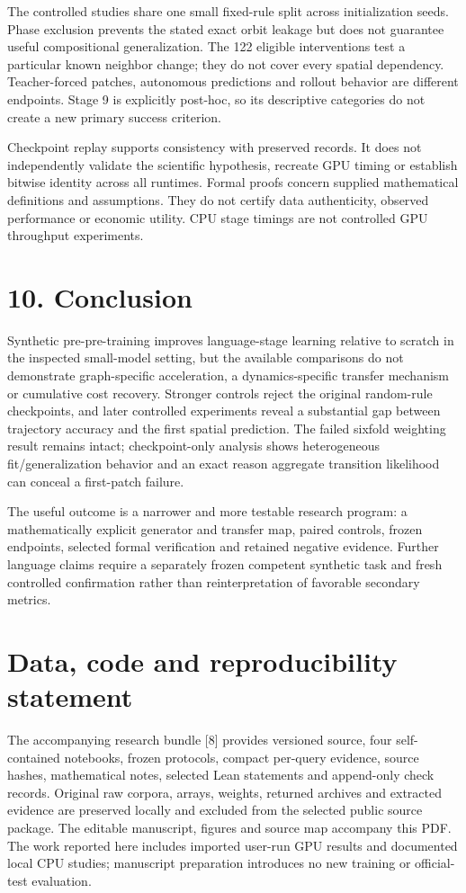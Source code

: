 \documentclass[11pt,a4paper]{article}
\begin{document}
The controlled studies share one small fixed-rule split across initialization seeds. Phase exclusion prevents the stated exact orbit leakage but does not guarantee useful compositional generalization. The 122 eligible interventions test a particular known neighbor change; they do not cover every spatial dependency. Teacher-forced patches, autonomous predictions and rollout behavior are different endpoints. Stage 9 is explicitly post-hoc, so its descriptive categories do not create a new primary success criterion.

Checkpoint replay supports consistency with preserved records. It does not independently validate the scientific hypothesis, recreate GPU timing or establish bitwise identity across all runtimes. Formal proofs concern supplied mathematical definitions and assumptions. They do not certify data authenticity, observed performance or economic utility. CPU stage timings are not controlled GPU throughput experiments.

\section*{10. Conclusion}
Synthetic pre-pre-training improves language-stage learning relative to scratch in the inspected small-model setting, but the available comparisons do not demonstrate graph-specific acceleration, a dynamics-specific transfer mechanism or cumulative cost recovery. Stronger controls reject the original random-rule checkpoints, and later controlled experiments reveal a substantial gap between trajectory accuracy and the first spatial prediction. The failed sixfold weighting result remains intact; checkpoint-only analysis shows heterogeneous fit/\allowbreak{}generalization behavior and an exact reason aggregate transition likelihood can conceal a first-patch failure.

The useful outcome is a narrower and more testable research program: a mathematically explicit generator and transfer map, paired controls, frozen endpoints, selected formal verification and retained negative evidence. Further language claims require a separately frozen competent synthetic task and fresh controlled confirmation rather than reinterpretation of favorable secondary metrics.

\section*{Data, code and reproducibility statement}
The accompanying research bundle [8] provides versioned source, four self-contained notebooks, frozen protocols, compact per-query evidence, source hashes, mathematical notes, selected Lean statements and append-only check records. Original raw corpora, arrays, weights, returned archives and extracted evidence are preserved locally and excluded from the selected public source package. The editable manuscript, figures and source map accompany this PDF. The work reported here includes imported user-run GPU results and documented local CPU studies; manuscript preparation introduces no new training or official-test evaluation.
\end{document}
